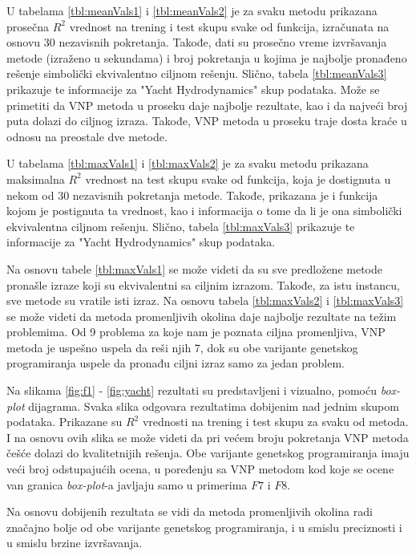 \documentclass[main.tex]{subfiles}
\begin{document}
U tabelama \ref{tbl:meanVals1} i \ref{tbl:meanVals2} je za svaku metodu prikazana prosečna $R^2$ vrednost na trening i test skupu svake od funkcija, izračunata na osnovu 30 nezavisnih pokretanja. Takođe, dati su prosečno vreme izvršavanja metode (izraženo u sekundama) i broj pokretanja u kojima je najbolje pronađeno rešenje simbolički ekvivalentno ciljnom rešenju. Slično, tabela \ref{tbl:meanVals3} prikazuje te informacije za "Yacht Hydrodynamics" skup podataka. Može se primetiti da VNP metoda u proseku daje najbolje rezultate, kao i da najveći broj puta dolazi do ciljnog izraza. Takođe, VNP metoda u proseku traje dosta kraće u odnosu na preostale dve metode. 

U tabelama \ref{tbl:maxVals1} i \ref{tbl:maxVals2} je za svaku metodu prikazana maksimalna $R^2$ vrednost na test skupu svake od funkcija, koja je dostignuta u nekom od 30 nezavisnih pokretanja metode. Takođe, prikazana je i funkcija kojom je postignuta ta vrednost, kao i informacija o tome da li je ona simbolički ekvivalentna ciljnom rešenju.
Slično, tabela \ref{tbl:maxVals3} prikazuje te informacije za "Yacht Hydrodynamics" skup podataka.

Na osnovu tabele \ref{tbl:maxVals1} se može videti da su sve predložene metode pronašle izraze koji su ekvivalentni sa ciljnim izrazom. Takođe, za istu instancu, sve metode su vratile isti izraz.
Na osnovu tabela \ref{tbl:maxVals2} i \ref{tbl:maxVals3} se može videti da metoda promenljivih okolina daje najbolje rezultate na težim problemima. Od 9 problema za koje nam je poznata ciljna promenljiva, VNP metoda je uspešno uspela da reši njih 7, dok su obe varijante genetskog programiranja uspele da pronađu ciljni izraz samo za jedan problem. 

Na slikama \ref{fig:f1} - \ref{fig:yacht} rezultati su predstavljeni i vizualno, pomoću \textit{box-plot} dijagrama. Svaka slika odgovara rezultatima dobijenim nad jednim skupom podataka. Prikazane su $R^2$ vrednosti na trening i test skupu za svaku od metoda. I na osnovu ovih slika se može videti da pri većem broju pokretanja VNP metoda češće dolazi do kvalitetnijih rešenja. Obe varijante genetskog programiranja imaju veći broj odstupajućih ocena, u poređenju sa VNP metodom kod koje se ocene van granica \textit{box-plot}-a javljaju samo u primerima $F7$ i $F8$.

Na osnovu dobijenih rezultata se vidi da metoda promenljivih okolina radi značajno bolje od obe varijante genetskog programiranja, i u smislu preciznosti i u smislu brzine izvršavanja.
\end{document}
